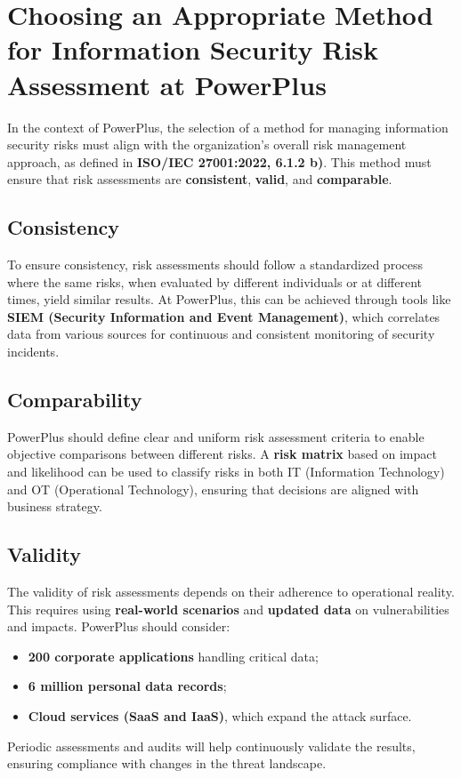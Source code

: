 \section{Choosing an Appropriate Method for Information Security Risk Assessment at PowerPlus}

In the context of PowerPlus, the selection of a method for managing information security risks must align with the organization's overall risk management approach, as defined in \textbf{ISO/IEC 27001:2022, 6.1.2 b)}. This method must ensure that risk assessments are \textbf{consistent}, \textbf{valid}, and \textbf{comparable}.

\subsection{Consistency}

To ensure consistency, risk assessments should follow a standardized process where the same risks, when evaluated by different individuals or at different times, yield similar results.  
At PowerPlus, this can be achieved through tools like \textbf{SIEM (Security Information and Event Management)}, which correlates data from various sources for continuous and consistent monitoring of security incidents.

\subsection{ Comparability}

PowerPlus should define clear and uniform risk assessment criteria to enable objective comparisons between different risks.  
A \textbf{risk matrix} based on impact and likelihood can be used to classify risks in both IT (Information Technology) and OT (Operational Technology), ensuring that decisions are aligned with business strategy.

\subsection{ Validity}

The validity of risk assessments depends on their adherence to operational reality. This requires using \textbf{real-world scenarios} and \textbf{updated data} on vulnerabilities and impacts.  
PowerPlus should consider:
\begin{itemize}
    \item \textbf{200 corporate applications} handling critical data;
    \item \textbf{6 million personal data records};
    \item \textbf{Cloud services (SaaS and IaaS)}, which expand the attack surface.
\end{itemize}
Periodic assessments and audits will help continuously validate the results, ensuring compliance with changes in the threat landscape.


